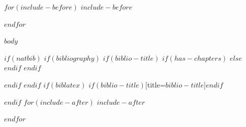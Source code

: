 \documentclass[conference,$if(fontsize)$$fontsize$,$endif$$if(draftmode)$$draftmode$,$endif$$if(papersize)$$papersize$,$endif$$for(classoption)$$classoption$$sep$,$endfor$]{IEEEtran}
\begin{document}
$for(include-before)$
$include-before$

$endfor$

$body$

$if(natbib)$
$if(bibliography)$
$if(biblio-title)$
$if(has-chapters)$
\renewcommand\bibname{$biblio-title$}
$else$
\renewcommand\refname{$biblio-title$}
$endif$
$endif$

$endif$
$endif$
$if(biblatex)$
\printbibliography$if(biblio-title)$[title=$biblio-title$]$endif$

$endif$
$for(include-after)$
$include-after$

$endfor$
\end{document}
